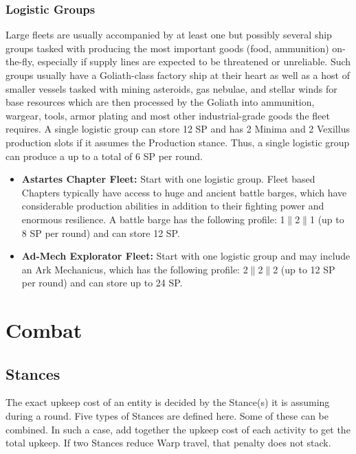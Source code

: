 \subsection{Logistic Groups}
Large fleets are usually accompanied by at least one but possibly several ship groups tasked with producing the most important goods (food, ammunition) on-the-fly, especially if supply lines are expected to be threatened or unreliable. 
Such groups usually have a Goliath-class factory ship at their heart as well as a host of smaller vessels tasked with mining asteroids, gas nebulae, and stellar winds for base resources which are then processed by the Goliath into ammunition, wargear, tools, armor plating and most other industrial-grade goods the fleet requires. \newline
A single logistic group can store 12 SP and has 2 Minima and 2 Vexillus production slots if it assumes the Production stance. Thus, a single logistic group can produce a up to a total of 6 SP per round.
\begin{itemize}
	\item \textbf{Astartes Chapter Fleet:} Start with one logistic group. Fleet based Chapters typically have access to huge and ancient battle barges, which have considerable production abilities in addition to their fighting power and enormous resilience. A battle barge has the following profile: 1$\|$2$\|$1 (up to 8 SP per round) and can store 12 SP.
	\item \textbf{Ad-Mech Explorator Fleet:} Start with one logistic group and may include an Ark Mechanicus, which has the following profile: 2$\|$2$\|$2 (up to 12 SP per round) and can store up to 24 SP.
\end{itemize}

\chapter{Combat}
\section{Stances} \label{stances}
The exact upkeep cost of an entity is decided by the Stance(s) it is assuming during a round. Five types of Stances are defined here. Some of these can be combined. In such a case, add together the upkeep cost of each activity to get the total upkeep. If two Stances reduce Warp travel, that penalty does not stack.

